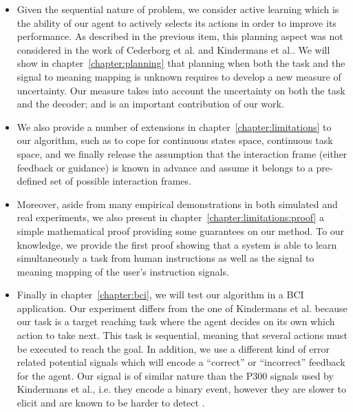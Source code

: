 \begin{itemize}
\item Given the sequential nature of problem, we consider active learning which is the ability of our agent to actively selects its actions in order to improve its performance. As described in the previous item, this planning aspect was not considered in the work of Cederborg et al. and Kindermans et al.. We will show in chapter~\ref{chapter:planning} that planning when both the task and the signal to meaning mapping is unknown requires to develop a new measure of uncertainty. Our measure takes into account the uncertainty on both the task and the decoder; and is an important contribution of our work.

\item We also provide a number of extensions in chapter~\ref{chapter:limitations} to our algorithm, such as to cope for continuous states space, continuous task space, and we finally release the assumption that the interaction frame (either feedback or guidance) is known in advance and assume it belongs to a pre-defined set of possible interaction frames.

\item Moreover, aside from many empirical demonstrations in both simulated and real experiments, we also present in chapter~\ref{chapter:limitations:proof} a simple mathematical proof providing some guarantees on our method. To our knowledge, we provide the first proof showing that a system is able to learn simultaneously a task from human instructions as well as the signal to meaning mapping of the user's instruction signals.

\item Finally in chapter~\ref{chapter:bci}, we will test our algorithm in a BCI application. Our experiment differs from the one of Kindermans et al. \cite{Kindermans2012a,kindermans2014true} because our task is a target reaching task where the agent decides on its own which action to take next. This task is sequential, meaning that several actions must be executed to reach the goal. In addition, we use a different kind of error related potential signals which will encode a ``correct'' or ``incorrect'' feedback for the agent. Our signal is of similar nature than the P300 signals used by Kindermans et al., i.e. they encode a binary event, however they are slower to elicit and are known to be harder to detect .

\end{itemize}

